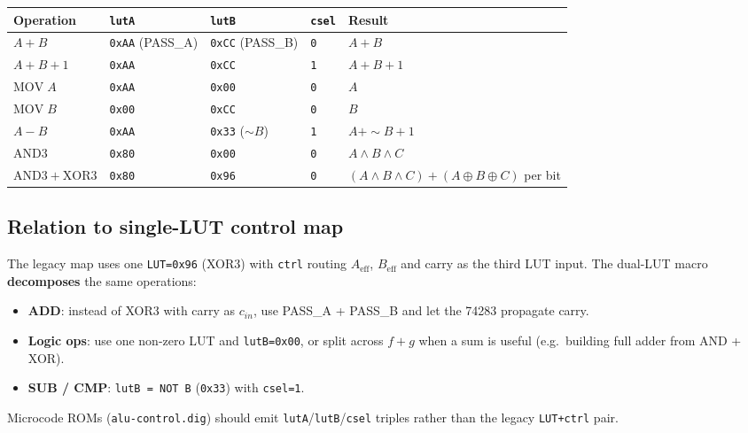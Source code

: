 \documentclass[10pt,a4paper]{article}
\begin{document}
\begin{center}
\scriptsize
\begin{tabular}{@{}lllll@{}}
\toprule
\textbf{Operation} & \textbf{\texttt{lutA}} & \textbf{\texttt{lutB}} & \textbf{\texttt{csel}} & \textbf{Result} \\
\midrule
$A + B$       & \texttt{0xAA} (PASS\_A) & \texttt{0xCC} (PASS\_B) & \texttt{0} & $A+B$ \\
$A + B + 1$   & \texttt{0xAA} & \texttt{0xCC} & \texttt{1} & $A+B+1$ \\
$\mathrm{MOV}\;A$ & \texttt{0xAA} & \texttt{0x00} & \texttt{0} & $A$ \\
$\mathrm{MOV}\;B$ & \texttt{0x00} & \texttt{0xCC} & \texttt{0} & $B$ \\
$A - B$       & \texttt{0xAA} & \texttt{0x33} ($\sim B$) & \texttt{1} & $A + \sim B + 1$ \\
$\mathrm{AND3}$ & \texttt{0x80} & \texttt{0x00} & \texttt{0} & $A \wedge B \wedge C$ \\
$\mathrm{AND3}+\mathrm{XOR3}$ & \texttt{0x80} & \texttt{0x96} & \texttt{0} & $(A \wedge B \wedge C) + (A \oplus B \oplus C)$ per bit \\
\bottomrule
\end{tabular}
\end{center}

\subsection{Relation to single-LUT control map}

The legacy map uses one \texttt{LUT=0x96} (XOR3) with \texttt{ctrl} routing $A_{\mathrm{eff}}$, $B_{\mathrm{eff}}$ and carry as the third LUT input. The dual-LUT macro \textbf{decomposes} the same operations:

\begin{itemize}
  \item \textbf{ADD}: instead of XOR3 with carry as $c_{in}$, use PASS\_A + PASS\_B and let the 74283 propagate carry.
  \item \textbf{Logic ops}: use one non-zero LUT and \texttt{lutB=0x00}, or split across $f+g$ when a sum is useful (e.g.\ building full adder from AND + XOR).
  \item \textbf{SUB / CMP}: \texttt{lutB = NOT B} (\texttt{0x33}) with \texttt{csel=1}.
\end{itemize}

Microcode ROMs (\texttt{alu-control.dig}) should emit \texttt{lutA}/\texttt{lutB}/\texttt{csel} triples rather than the legacy \texttt{LUT+ctrl} pair.
\end{document}
